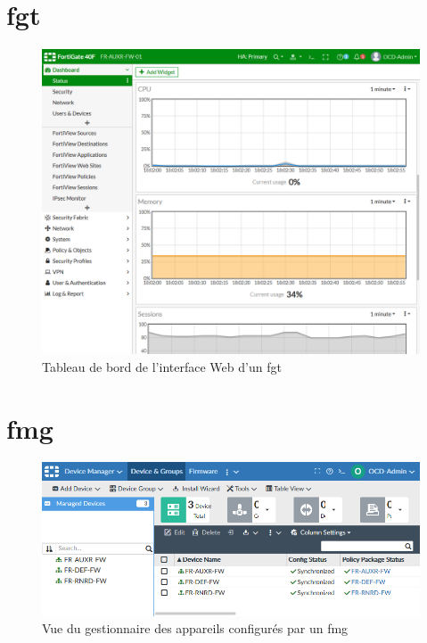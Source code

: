 \documentclass[12pt, oneside, a4paper, titlepage]{report}
\begin{document}
\section{\acrlong{fgt}}%
\label{sec:annexes::fgt}

\begin{figure}[h!]
    \centering
    \includegraphics[width = \linewidth]{img/fgt-auxr/dashboard.png}
    \caption{Tableau de bord de l'interface Web d'un \acrlong{fgt}}%
    \label{fig:fgt-auxr/dashboard.png}
\end{figure}

\section{\acrlong{fmg}}%
\label{sec:annexes::fmg}

\begin{figure}[h!]
    \centering
    \includegraphics[width = \linewidth]{img/fmg/device-manager.png}
    \caption{Vue du gestionnaire des appareils configurés par un \acrlong{fmg}}%
    \label{fig:fmg/device-manager.png}
\end{figure}
\end{document}
